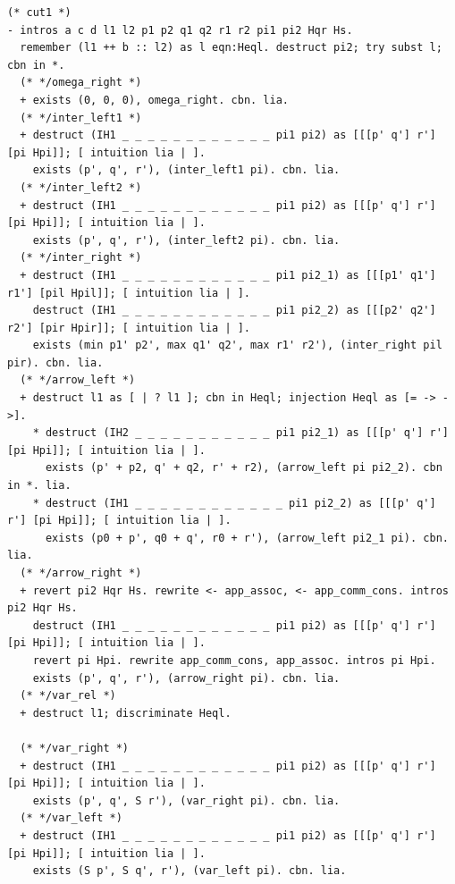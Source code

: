 \documentclass[10pt,a4paper]{article}
\begin{document}
\begin{lstlisting}
(* cut1 *)
- intros a c d l1 l2 p1 p2 q1 q2 r1 r2 pi1 pi2 Hqr Hs.
  remember (l1 ++ b :: l2) as l eqn:Heql. destruct pi2; try subst l; cbn in *.
  (* */omega_right *)
  + exists (0, 0, 0), omega_right. cbn. lia.
  (* */inter_left1 *)
  + destruct (IH1 _ _ _ _ _ _ _ _ _ _ _ _ pi1 pi2) as [[[p' q'] r'] [pi Hpi]]; [ intuition lia | ].
    exists (p', q', r'), (inter_left1 pi). cbn. lia.
  (* */inter_left2 *)
  + destruct (IH1 _ _ _ _ _ _ _ _ _ _ _ _ pi1 pi2) as [[[p' q'] r'] [pi Hpi]]; [ intuition lia | ].
    exists (p', q', r'), (inter_left2 pi). cbn. lia.
  (* */inter_right *)
  + destruct (IH1 _ _ _ _ _ _ _ _ _ _ _ _ pi1 pi2_1) as [[[p1' q1'] r1'] [pil Hpil]]; [ intuition lia | ].
    destruct (IH1 _ _ _ _ _ _ _ _ _ _ _ _ pi1 pi2_2) as [[[p2' q2'] r2'] [pir Hpir]]; [ intuition lia | ].
    exists (min p1' p2', max q1' q2', max r1' r2'), (inter_right pil pir). cbn. lia.
  (* */arrow_left *)
  + destruct l1 as [ | ? l1 ]; cbn in Heql; injection Heql as [= -> ->].
    * destruct (IH2 _ _ _ _ _ _ _ _ _ _ _ pi1 pi2_1) as [[[p' q'] r'] [pi Hpi]]; [ intuition lia | ].
      exists (p' + p2, q' + q2, r' + r2), (arrow_left pi pi2_2). cbn in *. lia.
    * destruct (IH1 _ _ _ _ _ _ _ _ _ _ _ _ pi1 pi2_2) as [[[p' q'] r'] [pi Hpi]]; [ intuition lia | ].
      exists (p0 + p', q0 + q', r0 + r'), (arrow_left pi2_1 pi). cbn. lia.
  (* */arrow_right *)
  + revert pi2 Hqr Hs. rewrite <- app_assoc, <- app_comm_cons. intros pi2 Hqr Hs.
    destruct (IH1 _ _ _ _ _ _ _ _ _ _ _ _ pi1 pi2) as [[[p' q'] r'] [pi Hpi]]; [ intuition lia | ].
    revert pi Hpi. rewrite app_comm_cons, app_assoc. intros pi Hpi.
    exists (p', q', r'), (arrow_right pi). cbn. lia.
  (* */var_rel *)
  + destruct l1; discriminate Heql.

  (* */var_right *)
  + destruct (IH1 _ _ _ _ _ _ _ _ _ _ _ _ pi1 pi2) as [[[p' q'] r'] [pi Hpi]]; [ intuition lia | ].
    exists (p', q', S r'), (var_right pi). cbn. lia.
  (* */var_left *)
  + destruct (IH1 _ _ _ _ _ _ _ _ _ _ _ _ pi1 pi2) as [[[p' q'] r'] [pi Hpi]]; [ intuition lia | ].
    exists (S p', S q', r'), (var_left pi). cbn. lia.


\end{lstlisting}
\end{document}
